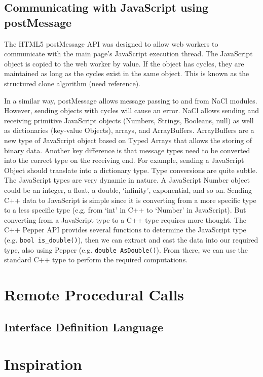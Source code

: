 \subsection{Communicating with JavaScript using postMessage}
The HTML5 postMessage API was designed to allow web workers to communicate with the main page's JavaScript execution thread. The JavaScript object is copied to the web worker by value. If the object has cycles, they are maintained as long as the cycles exist in the same object. This is known as the structured clone algorithm (need reference). 

In a similar way, postMessage allows message passing to and from NaCl modules. However, sending objects with cycles will cause an error. NaCl allows sending and receiving primitive JavaScript objects (Numbers, Strings, Booleans, null) as well as dictionaries (key-value Objects), arrays, and ArrayBuffers. ArrayBuffers are a new type of JavaScript object based on Typed Arrays \cite{typedarraysw3c} that allows the storing of binary data. Another key difference is that message types need to be converted into the correct type on the receiving end. For example, sending a JavaScript Object should translate into a dictionary type. Type conversions are quite subtle. The JavaScript types are very dynamic in nature. A JavaScript Number object could be an integer, a float, a double, `infinity', exponential, and so on. Sending C++ data to JavaScript is simple since it is converting from a more specific type to a less specific type (e.g. from `int' in C++ to `Number' in JavaScript). But converting from a JavaScript type to a C++ type requires more thought. The C++ Pepper API provides several functions to determine the JavaScript type (e.g. \verb+bool is_double()+), then we can extract and cast the data into our required type, also using Pepper (e.g. \verb+double AsDouble()+). From there, we can use the standard C++ type to perform the required computations.

\section{Remote Procedural Calls}


\subsection{Interface Definition Language}

\section{Inspiration}


